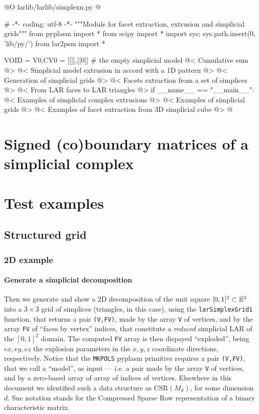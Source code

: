 \documentclass[11pt,oneside]{article}	%
\begin{document}
@O larlib/larlib/simplexn.py 
@{# -*- coding: utf-8 -*-
"""Module for facet extraction, extrusion and simplicial grids"""
from pyplasm import *
from scipy import *
import sys; sys.path.insert(0, 'lib/py/')
from lar2psm import *

VOID = V0,CV0 = [[]],[[0]]    # the empty simplicial model
@< Cumulative sum  @>
@< Simplicial model extrusion in accord with a 1D pattern @>
@< Generation of simplicial grids @>
@< Facets extraction from a set of simplices @>
@< From LAR faces to LAR triangles @>
if __name__ == "__main__":
	@< Examples of simplicial complex extrusions @>
	@< Examples of simplicial grids @>
	@< Examples of facet extraction from 3D simplicial cube @>
@}


\section{Signed (co)boundary matrices of a simplicial complex}
\label{simplicial}

\section{Test examples}

\subsection{Structured grid}

\subsubsection{2D example}

\paragraph{Generate a simplicial decomposition}
Then we generate and show a 2D decomposition of the unit square $[0,1]^2\subset\mathbb{E}^2$ into a $3\times 3$ grid of simplices (triangles, in this case), using the \texttt{larSimplexGrid1} function, that returns a pair \texttt{(V,FV)}, made by the array \texttt{V} of vertices, and by the array \texttt{FV} of ``faces by vertex'' indices, that constitute a \emph{reduced} simplicial LAR of the $[0,1]^2$ domain. The computed \texttt{FV} array is then dispayed ``exploded'', being $ex,ey,ez$ the explosion parameters in the $x,y,z$ coordinate directions, respectively. Notice that the \texttt{MKPOLS} pyplasm primitive requires a pair \texttt{(V,FV)}, that we call a ``model'', as input --- i.e. a pair made by the array \texttt{V} of vertices, and by a zero-based array of array of indices of vertices. Elsewhere in this document we identified such a data structure as CSR$(M_d)$, for some dimension $d$. Suc notation stands for the Compressed Sparse Row representation of a binary characteristic matrix.
\end{document}
